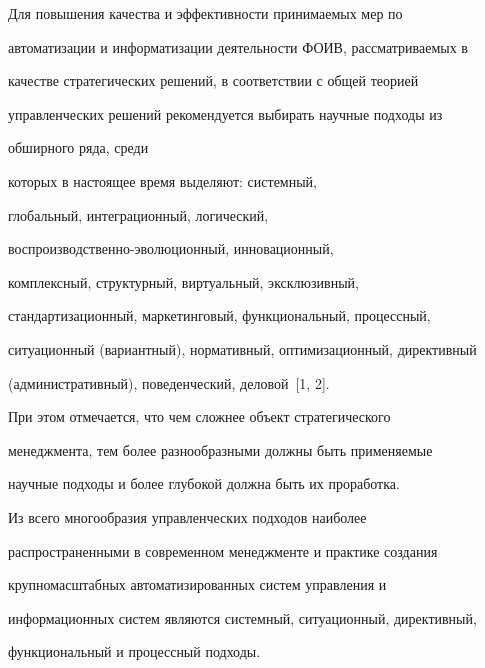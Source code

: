        


       Для повышения качества и эффективности принимаемых мер по 


автоматизации и информатизации деятельности ФОИВ, рассматриваемых в 


качестве стратегических решений, в соответствии с общей теорией 


управленческих решений рекомендуется выбирать научные подходы из 


обширного ряда, среди\linebreak\vspace*{-12pt}


\pagebreak





\noindent


которых в настоящее время выделяют: системный, 


глобальный, интеграционный, логический, 


       вос\-про\-из\-вод\-ст\-вен\-но-эво\-лю\-ци\-он\-ный, инновационный, 


комплексный, структурный, виртуальный, эксклюзивный, 


стандартизационный, маркетинговый, функциональный, процессный, 


ситуационный (вариантный), нормативный, оптимизационный, директивный 


(административный), поведенческий, деловой~[1, 2].


       


       При этом отмечается, что чем сложнее объект стратегического 


менеджмента, тем более разнообразными должны быть применяемые 


научные подходы и более глубокой должна быть их проработка.  


       


       Из всего многообразия управленческих подходов наиболее 


распространенными в современном менеджменте и практике создания 


крупномасштабных автоматизированных систем управления и 


информационных систем являются системный, ситуационный, директивный, 


функциональный и процессный подходы.


       


